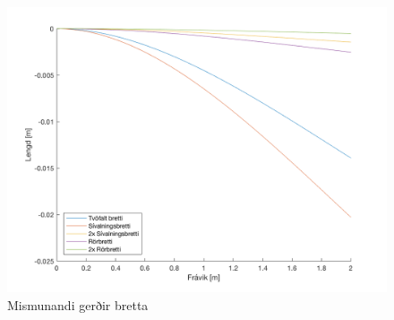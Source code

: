 \documentclass[11pt]{article}
\begin{document}
{\begin{figure}[H]
\begin{center}
\includegraphics[scale=0.26]{hellingur.png}
\caption{Mismunandi gerðir bretta}
\end{center}
\end{figure}

}
\end{document}
